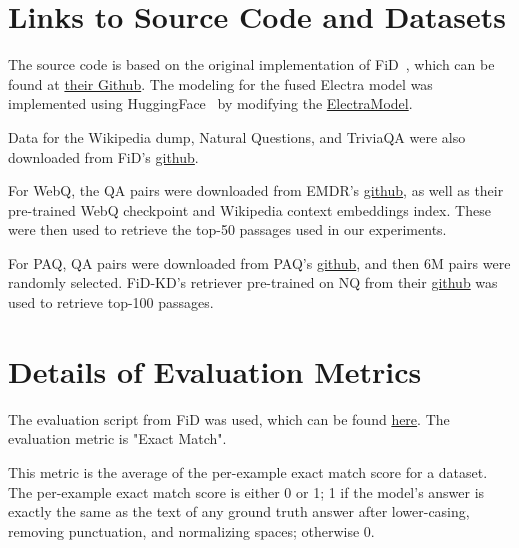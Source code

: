 \documentclass[11pt]{article}
\begin{document}
\section{Links to Source Code and Datasets}
\label{download_links}

The source code is based on the original implementation of FiD~\citep{fid}, which can be found at \href{https://github.com/facebookresearch/FiD/blob/25ed1ff0fe0288b80fb5e9e5de8d6346b94b8d48/README.md}{their Github}. The modeling for the fused Electra model was implemented using HuggingFace~\cite{huggingface} by modifying the \href{https://github.com/huggingface/transformers/blob/b0892fa0e8df02d683e05e625b3903209bff362d/src/transformers/modeling_electra.py}{ElectraModel}.

Data for the Wikipedia dump, Natural Questions, and TriviaQA were also downloaded from FiD's \href{https://github.com/facebookresearch/FiD/blob/25ed1ff0fe0288b80fb5e9e5de8d6346b94b8d48/README.md}{github}.

For WebQ, the QA pairs were downloaded from EMDR's \href{https://github.com/DevSinghSachan/emdr2/blob/edb8cf6701bfa4ad7c961a21cdb461f4f7a0c72f/README.md}{github}, as well as their pre-trained WebQ checkpoint and Wikipedia context embeddings index. These were then used to retrieve the top-50 passages used in our experiments.

For PAQ, QA pairs were downloaded from PAQ's \href{https://github.com/facebookresearch/PAQ/blob/2bfd2c85e58eaac626d8d5082299a676662f51d3/README.md}{github}, and then 6M pairs were randomly selected. FiD-KD's retriever pre-trained on NQ from their \href{https://github.com/facebookresearch/FiD/blob/25ed1ff0fe0288b80fb5e9e5de8d6346b94b8d48/README.md}{github} was used to retrieve top-100 passages.

\section{Details of Evaluation Metrics}

The evaluation script from FiD was used, which can be found \href{https://github.com/facebookresearch/FiD/blob/25ed1ff0fe0288b80fb5e9e5de8d6346b94b8d48/src/evaluation.py}{here}. The evaluation metric is "Exact Match".

This metric is the average of the per-example exact match score for a dataset. The per-example exact match score is either 0 or 1; 1 if the model's answer is exactly the same as the text of any ground truth answer after lower-casing, removing punctuation, and normalizing spaces; otherwise 0. 
\end{document}
